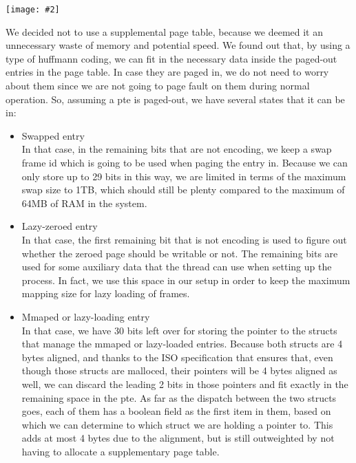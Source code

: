 \documentclass{report}
\newcommand{\centerimage}[2]{\begin{center}
	\texttt{[image: \#2]}
\end{center}}
\newcommand{\compitem}[1]{\begin{itemize}\setlength\itemsep{-0.5em}#1\end{itemize}}
\begin{document}
				\centerimage{width=\textwidth}{page table entry.png}
				We decided not to use a supplemental page table, because we deemed
				it an unnecessary waste of memory and potential speed. We found out
				that, by using a type of huffmann coding, we can fit in the necessary
				data inside the paged-out entries in the page table. In case they are
				paged in, we do not need to worry about them since we are not going to
				page fault on them during normal operation. So, assuming a pte is
				paged-out, we have several states that it can be in:
				\compitem{
					\item Swapped entry
							\\In that case, in the remaining bits that are not encoding,
							we keep a swap frame id which is going to be used when paging
							the entry in. Because we can only store up to 29 bits in this
							way, we are limited in terms of the maximum swap size to 1TB,
							which should still be plenty compared to the maximum of 64MB
							of RAM in the system.
					\item Lazy-zeroed entry
							\\In that case, the first remaining bit that is not encoding
							is used to figure out whether the zeroed page should be
							writable or not. The remaining bits are used for some auxiliary
							data that the thread can use when setting up the process.
							In fact, we use this space in our setup in order to keep the
							maximum mapping size for lazy loading of frames.
					\item Mmaped or lazy-loading entry
							\\ In that case, we have 30 bits left over for storing the
							pointer to the structs that manage the mmaped or lazy-loaded
							entries. Because both structs are 4 bytes aligned, and thanks
							to the ISO specification that ensures that, even though those
							structs are malloced, their pointers will be 4 bytes aligned as well,
							we can discard the leading 2 bits in those pointers and fit exactly in
							the remaining space in the pte. As far as the dispatch between the
							two structs goes, each of them has a boolean field as the first item in
							them, based on which we can determine to which struct we are holding a
							pointer to. This adds at most 4 bytes due to the alignment, but is
							still outweighted by not having to allocate a supplementary page table.
				}
				
\end{document}
